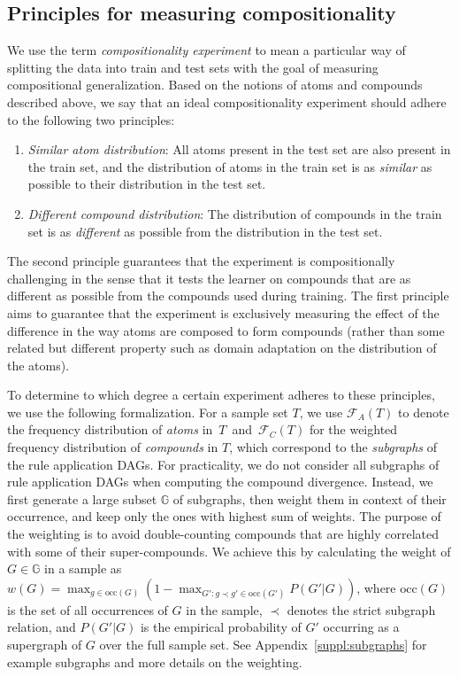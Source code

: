 \documentclass[letterpaper]{article}
\begin{document}
\subsection{Principles for measuring compositionality}
\label{sect:compositionality_principles}
\vspace{-1ex}

We use the term {\em compositionality experiment} to mean a particular way of splitting the data into train and test sets with the goal of measuring compositional generalization.
Based on the notions of atoms and compounds described above, we say that an ideal compositionality experiment should adhere to the following two principles:
\vspace{-1ex}\begin{enumerate}
    \item \emph{Similar atom distribution}: All atoms present in the test set are also present in the train set, and the distribution of atoms in the train set is as {\em similar} as possible to their distribution in the test set.
    \vspace{-0.2ex}\item \emph{Different compound distribution}: The distribution of compounds in the train set is as {\em different} as possible from the distribution in the test set.
    \vspace{-1ex}\end{enumerate}
The second principle guarantees that the experiment is compositionally challenging in the sense that it tests the learner on compounds that are as different as possible from the compounds used during training. The first principle aims to guarantee that the experiment is exclusively measuring the effect of the difference in the way atoms are composed to form compounds (rather than some related but different property such as domain adaptation on the distribution of the atoms).



To determine to which degree a certain experiment adheres to these principles, we use the \mbox{following} formalization. For a sample set $T$, we use $\mathcal{F}_A(T)$ to denote the frequency distribution of \textit{atoms} 
in~$T$~and~$\mathcal{F}_C(T)$ 
for the weighted frequency distribution of \textit{compounds} in $T$, which correspond to the \textit{subgraphs} of the rule application DAGs.
For practicality, we do not consider all subgraphs of rule application DAGs when computing the compound divergence. Instead, we first generate a large subset $\mathbb{G}$ of subgraphs, then weight them in context of their occurrence, and keep only the ones with highest sum of weights. The purpose of the weighting is to avoid double-counting compounds that are highly correlated with some of their super-compounds.
We achieve this by calculating the weight of $G \in \mathbb{G}$ in a sample as $w(G) = \max_{g \in \text{occ}(G)} (1 - \max_{G': g \prec g' \in \text{occ}(G')} P(G'| G))$, where 
$\text{occ}(G)$ is the set of all occurrences of $G$ in the sample, $\prec$  denotes the strict subgraph relation, and $P(G'| G)$ is the empirical probability of $G'$ occurring as a supergraph of $G$ over the full sample set.
See Appendix~\ref{suppl:subgraphs} for example subgraphs and more details on the weighting.
\end{document}
